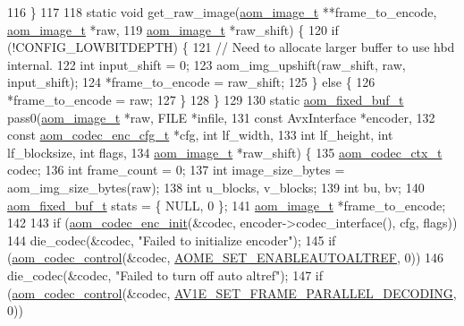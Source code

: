 \begin{DoxyCodeInclude}
{116 \}
117 
118 \textcolor{keyword}{static} \textcolor{keywordtype}{void} get\_raw\_image(\hyperlink{structaom__image}{aom\_image\_t} **frame\_to\_encode, \hyperlink{structaom__image}{aom\_image\_t} *raw,
119                           \hyperlink{structaom__image}{aom\_image\_t} *raw\_shift) \{
120   \textcolor{keywordflow}{if} (!CONFIG\_LOWBITDEPTH) \{
121     \textcolor{comment}{// Need to allocate larger buffer to use hbd internal.}
122     \textcolor{keywordtype}{int} input\_shift = 0;
123     aom\_img\_upshift(raw\_shift, raw, input\_shift);
124     *frame\_to\_encode = raw\_shift;
125   \} \textcolor{keywordflow}{else} \{
126     *frame\_to\_encode = raw;
127   \}
128 \}
129 
130 \textcolor{keyword}{static} \hyperlink{structaom__fixed__buf}{aom\_fixed\_buf\_t} pass0(\hyperlink{structaom__image}{aom\_image\_t} *raw, FILE *infile,
131                              \textcolor{keyword}{const} AvxInterface *encoder,
132                              \textcolor{keyword}{const} \hyperlink{structaom__codec__enc__cfg}{aom\_codec\_enc\_cfg\_t} *cfg, \textcolor{keywordtype}{int} lf\_width,
133                              \textcolor{keywordtype}{int} lf\_height, \textcolor{keywordtype}{int} lf\_blocksize, \textcolor{keywordtype}{int} flags,
134                              \hyperlink{structaom__image}{aom\_image\_t} *raw\_shift) \{
135   \hyperlink{structaom__codec__ctx}{aom\_codec\_ctx\_t} codec;
136   \textcolor{keywordtype}{int} frame\_count = 0;
137   \textcolor{keywordtype}{int} image\_size\_bytes = aom\_img\_size\_bytes(raw);
138   \textcolor{keywordtype}{int} u\_blocks, v\_blocks;
139   \textcolor{keywordtype}{int} bu, bv;
140   \hyperlink{structaom__fixed__buf}{aom\_fixed\_buf\_t} stats = \{ NULL, 0 \};
141   \hyperlink{structaom__image}{aom\_image\_t} *frame\_to\_encode;
142 
143   \textcolor{keywordflow}{if} (\hyperlink{group__encoder_gaade68a7d33d30f97dc9a596aa5e065d8}{aom\_codec\_enc\_init}(&codec, encoder->codec\_interface(), cfg, flags))
144     die\_codec(&codec, \textcolor{stringliteral}{"Failed to initialize encoder"});
145   \textcolor{keywordflow}{if} (\hyperlink{group__codec_ga6da974f4eeaba1fa74106b28d0fe6ac5}{aom\_codec\_control}(&codec, \hyperlink{group__aom__encoder_ggae78dde67a6d78f332e9bdba0dde42db5ac8a24393f214823f5a6bd345afb840b6}{AOME\_SET\_ENABLEAUTOALTREF}, 0))
146     die\_codec(&codec, \textcolor{stringliteral}{"Failed to turn off auto altref"});
147   \textcolor{keywordflow}{if} (\hyperlink{group__codec_ga6da974f4eeaba1fa74106b28d0fe6ac5}{aom\_codec\_control}(&codec, 
      \hyperlink{group__aom__encoder_ggae78dde67a6d78f332e9bdba0dde42db5a465382b6bbca24467739c3c1b94e6483}{AV1E\_SET\_FRAME\_PARALLEL\_DECODING}, 0))
}
\end{DoxyCodeInclude}
